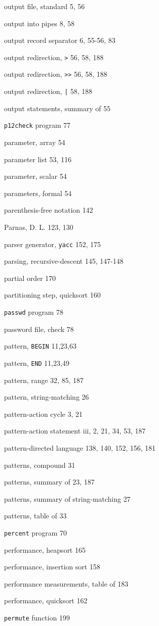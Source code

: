 \begin{multicols}{3}
output file, standard 5, 56

output into pipes 8, 58

output record separator 6, 55-56,  83

output redirection, \verb'>' 56, 58, 188

output redirection, \verb'>>' 56, 58, 188

output redirection, \verb'|' 58, 188

output statements, summary of 55

\verb'p12check' program 77

parameter, array 54

parameter list 53, 116

parameter, scalar 54

parameters, formal 54

parenthesis-free notation 142

Parnas, D. L. 123, 130

parser generator, \verb'yacc' 152, 175

parsing, recursive-descent 145, 147-148

partial order 170

partitioning step, quicksort 160

\verb'passwd' program 78

password file, check 78

pattern, \verb'BEGIN' 11,23,63

pattern, \verb'END' 11,23,49

pattern, range 32, 85, 187

pattern, string-matching 26

pattern-action cycle 3, 21

pattern-action statement iii, 2, 21, 34, 53, 187

pattern-directed language 138,  140, 152, 156, 181

patterns, compound 31

patterns, summary of 23, 187

patterns, summary of string-matching 27

patterns, table of 33

\verb'percent' program 70

performance, heapsort 165

performance, insertion sort 158

performance measurements, table of 183

performance, quicksort 162

\verb'permute' function 199


\end{multicols}
